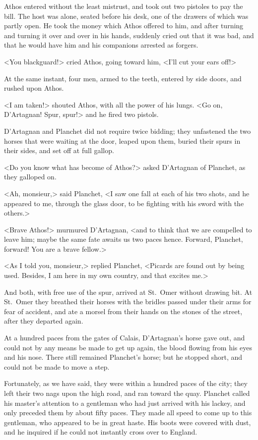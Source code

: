 Athos entered without the least mistrust, and took out two pistoles to pay the bill. The host was alone, seated before his desk, one of the drawers of which was partly open. He took the money which Athos offered to him, and after turning and turning it over and over in his hands, suddenly cried out that it was bad, and that he would have him and his companions arrested as forgers. 

<You blackguard!> cried Athos, going toward him, <I'll cut your ears off!> 

At the same instant, four men, armed to the teeth, entered by side doors, and rushed upon Athos. 

<I am taken!> shouted Athos, with all the power of his lungs. <Go on, D'Artagnan! Spur, spur!> and he fired two pistols. 

D'Artagnan and Planchet did not require twice bidding; they unfastened the two horses that were waiting at the door, leaped upon them, buried their spurs in their sides, and set off at full gallop. 

<Do you know what has become of Athos?> asked D'Artagnan of Planchet, as they galloped on. 

<Ah, monsieur,> said Planchet, <I saw one fall at each of his two shots, and he appeared to me, through the glass door, to be fighting with his sword with the others.> 

<Brave Athos!> murmured D'Artagnan, <and to think that we are compelled to leave him; maybe the same fate awaits us two paces hence. Forward, Planchet, forward! You are a brave fellow.> 

<As I told you, monsieur,> replied Planchet, <Picards are found out by being used. Besides, I am here in my own country, and that excites me.> 

And both, with free use of the spur, arrived at St.~Omer without drawing bit. At St.~Omer they breathed their horses with the bridles passed under their arms for fear of accident, and ate a morsel from their hands on the stones of the street, after they departed again. 

At a hundred paces from the gates of Calais, D'Artagnan's horse gave out, and could not by any means be made to get up again, the blood flowing from his eyes and his nose. There still remained Planchet's horse; but he stopped short, and could not be made to move a step. 

Fortunately, as we have said, they were within a hundred paces of the city; they left their two nags upon the high road, and ran toward the quay. Planchet called his master's attention to a gentleman who had just arrived with his lackey, and only preceded them by about fifty paces. They made all speed to come up to this gentleman, who appeared to be in great haste. His boots were covered with dust, and he inquired if he could not instantly cross over to England. 

